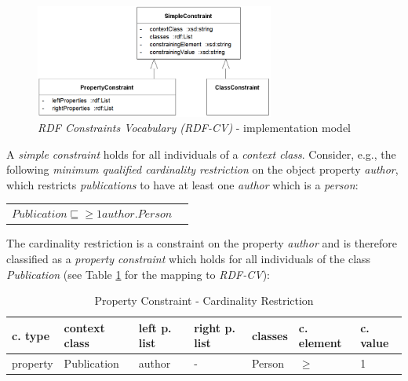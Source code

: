 \documentclass[a4paper,fontsize=11pt]{scrartcl}
\newenvironment{DL}{
  \vspace{0cm}
	\begin{center}
  \begin{tabular}{r l}

}{
  \end{tabular}
	\end{center}
}
\begin{document}
\begin{figure}
	\centering
		\includegraphics[width=0.70\textwidth]{images/RDF-CV-implementation-model.png}
	\caption{\emph{RDF Constraints Vocabulary (RDF-CV)} - implementation model}
	\label{fig:RDF-CV-implementation-model}
\end{figure}

A \emph{simple constraint} holds for all individuals of a \emph{context class}.
Consider, e.g., the following \emph{minimum qualified cardinality restriction} on the object property \emph{author}, which restricts \emph{publications} to have at least one \emph{author} which is a \emph{person}: 
\begin{DL}
$Publication \sqsubseteq \geq1 author . Person $
\end{DL}
The cardinality restriction is a constraint on the property \emph{author} and is therefore classified as a \emph{property constraint} which holds for all individuals of the class \emph{Publication} (see Table \ref{tab:property-constraint-cardinality-restriction} for the mapping to \emph{RDF-CV}):

\begin{table}
  \scriptsize
  \sffamily
  \vspace{0cm}
	\caption{Property Constraint - Cardinality Restriction}
	\label{tab:property-constraint-cardinality-restriction}
	\centering
		\begin{tabular}{l|l|l|l|l|l|l}
      \textbf{c. type} & \textbf{context class} & \textbf{left p. list} & \textbf{right p. list} & \textbf{classes} & \textbf{c. element} & \textbf{c. value} \\
      \hline
      property & Publication & author & - & Person & $\geq$ & 1 \\
		\end{tabular}
\end{table}
\end{document}
